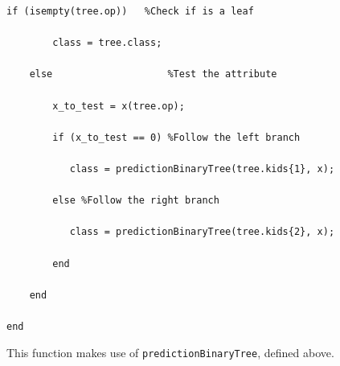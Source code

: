 \documentclass{article}
\begin{document}
\begin{lstlisting}[firstnumber=28]
    if (isempty(tree.op))   %Check if is a leaf
        
        class = tree.class;
        
    else                    %Test the attribute
        
        x_to_test = x(tree.op);
        
        if (x_to_test == 0) %Follow the left branch
           
           class = predictionBinaryTree(tree.kids{1}, x);
            
        else %Follow the right branch
            
           class = predictionBinaryTree(tree.kids{2}, x);
            
        end
        
    end

end
\end{lstlisting}

This function makes use of \verb$predictionBinaryTree$, defined above. 
\end{document}
